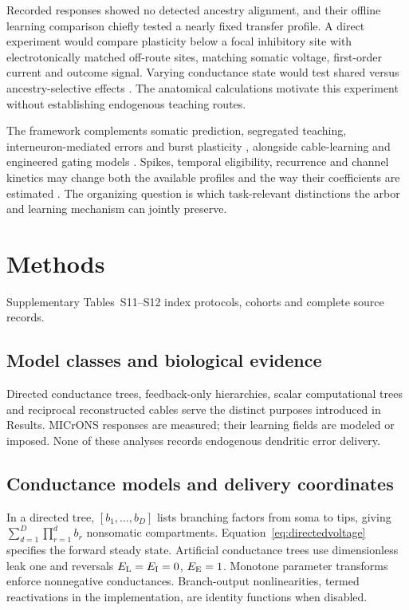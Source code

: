 \documentclass[11pt]{article}
\begin{document}
Recorded responses showed no detected ancestry alignment, and their offline learning comparison chiefly tested a nearly fixed transfer profile. A direct experiment would compare plasticity below a focal inhibitory site with electrotonically matched off-route sites, matching somatic voltage, first-order current and outcome signal. Varying conductance state would test shared versus ancestry-selective effects \citep{francioni2026vectorized,cichon2015branch,bloss2016structured}. The anatomical calculations motivate this experiment without establishing endogenous teaching routes.

The framework complements somatic prediction, segregated teaching, interneuron-mediated errors and burst plasticity \citep{urbanczik2014dendritic,guerguiev2017segregated,sacramento2018dendritic,payeur2021burst}, alongside cable-learning and engineered gating models \citep{bicknell2021synaptic,chavlis2025dendrites,sezener2021gated,iyer2022activedendrites,lv2025dendritic}. Spikes, temporal eligibility, recurrence and channel kinetics may change both the available profiles and the way their coefficients are estimated \citep{bittner2017btsp,magee2020plasticity}. The organizing question is which task-relevant distinctions the arbor and learning mechanism can jointly preserve.

\section*{Methods}

Supplementary Tables~S11--S12 index protocols, cohorts and complete source records.

\subsection*{Model classes and biological evidence}

Directed conductance trees, feedback-only hierarchies, scalar computational trees and reciprocal reconstructed cables serve the distinct purposes introduced in Results. MICrONS responses are measured; their learning fields are modeled or imposed. None of these analyses records endogenous dendritic error delivery.



\subsection*{Conductance models and delivery coordinates}

In a directed tree, $[b_1,\ldots,b_D]$ lists branching factors from soma to tips, giving $\sum_{d=1}^D\prod_{r=1}^db_r$ nonsomatic compartments. Equation~\ref{eq:directedvoltage} specifies the forward steady state. Artificial conductance trees use dimensionless leak one and reversals $E_{\rm L}=E_{\rm I}=0$, $E_{\rm E}=1$. Monotone parameter transforms enforce nonnegative conductances. Branch-output nonlinearities, termed reactivations in the implementation, are identity functions when disabled.
\end{document}
